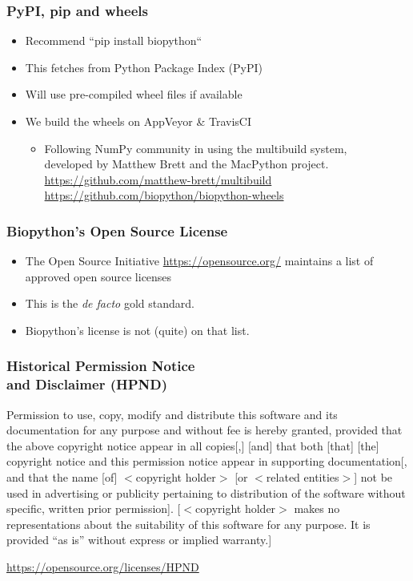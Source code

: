 \begin{frame}
\frametitle{PyPI, pip and wheels}
\begin{itemize}
\item Recommend ``pip install biopython``
\item This fetches from Python Package Index (PyPI)
\item Will use pre-compiled wheel files if available
\item We build the wheels on AppVeyor \& TravisCI
    \begin{itemize}
        \item Following NumPy community in using the multibuild system, \\
              developed by Matthew Brett and the MacPython project. \\
              \url{https://github.com/matthew-brett/multibuild} \\
              \url{https://github.com/biopython/biopython-wheels}
    \end{itemize}
\end{itemize}
\end{frame}


\begin{frame}
\frametitle{Biopython's Open Source License}
\begin{itemize}
\item The Open Source Initiative \url{https://opensource.org/}
    maintains a list of approved open source licenses
\item This is the \textit{de facto} gold standard.
\item Biopython's license is not (quite) on that list.
\end{itemize}
\end{frame}

\begin{frame}
\frametitle{Historical Permission Notice \\ and Disclaimer (HPND)}
Permission to use, copy, modify and distribute this software and its documentation for any purpose and without fee is hereby granted, provided that the above copyright notice appear in all copies[,] [and] that both [that] [the] copyright notice and this permission notice appear in supporting documentation[, and that the name [of] $<$copyright holder$>$ [or $<$related entities$>$] not be used in advertising or publicity pertaining to distribution of the software without specific, written prior permission]. [$<$copyright holder$>$ makes no representations about the suitability of this software for any purpose. It is provided ``as is'' without express or implied warranty.]


\url{https://opensource.org/licenses/HPND}
\end{frame}

